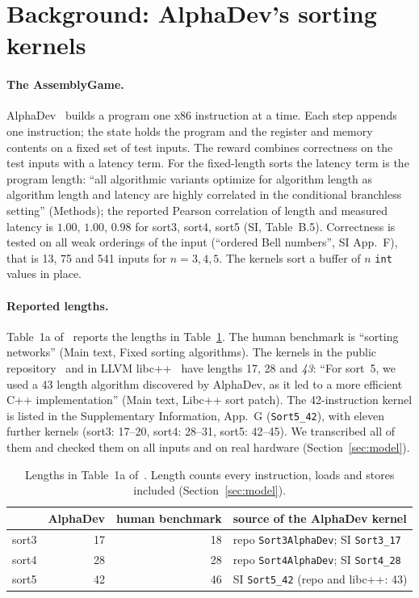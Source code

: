 \section{Background: AlphaDev's sorting kernels}\label{sec:background}

\paragraph{The AssemblyGame.}
AlphaDev~\cite{alphadev} builds a program one x86 instruction at a time. Each step appends one instruction; the state holds
the program and the register and memory contents on a fixed set of test inputs. The reward combines correctness on the test
inputs with a latency term. For the fixed-length sorts the latency term is the program length: ``all algorithmic variants
optimize for algorithm length as algorithm length and latency are highly correlated in the conditional branchless setting''
(Methods); the reported Pearson correlation of length and measured latency is $1.00$, $1.00$, $0.98$ for sort3, sort4,
sort5 (SI, Table~B.5). Correctness is tested on all weak orderings of the input (``ordered Bell numbers'', SI App.~F), that
is 13, 75 and 541 inputs for $n = 3,4,5$. The kernels sort a buffer of $n$ \texttt{int} values in place.

\paragraph{Reported lengths.}
Table~1a of~\cite{alphadev} reports the lengths in Table~\ref{tab:lengths}. The human benchmark is ``sorting networks'' (Main
text, Fixed sorting algorithms). The kernels in the public repository~\cite{alphadevrepo} and in LLVM
libc++~\cite{d118029} have lengths 17, 28 and \emph{43}: ``For sort~5, we used a 43 length algorithm discovered by AlphaDev, as
it led to a more efficient C++ implementation'' (Main text, Libc++ sort patch). The 42-instruction kernel is listed in the
Supplementary Information, App.~G (\texttt{Sort5\_42}), with eleven further kernels (sort3: 17--20, sort4: 28--31, sort5:
42--45). We transcribed all of them and checked them on all inputs and on real hardware (Section~\ref{sec:model}).

\begin{table}[h]\centering
\begin{tabular}{lrrl}\toprule
 & AlphaDev & human benchmark & source of the AlphaDev kernel \\\midrule
sort3 & 17 & 18 & repo \texttt{Sort3AlphaDev}; SI \texttt{Sort3\_17} \\
sort4 & 28 & 28 & repo \texttt{Sort4AlphaDev}; SI \texttt{Sort4\_28} \\
sort5 & 42 & 46 & SI \texttt{Sort5\_42} (repo and libc++: 43) \\\bottomrule
\end{tabular}
\caption{Lengths in Table~1a of~\cite{alphadev}. Length counts every instruction, loads and stores included (Section~\ref{sec:model}).}
\label{tab:lengths}
\end{table}

